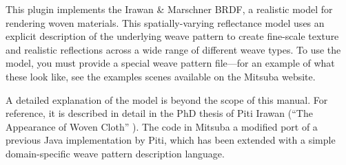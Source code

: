 This plugin implements the Irawan \& Marschner BRDF,
a realistic model for rendering woven materials.
This spatially-varying reflectance model uses an explicit description
of the underlying weave pattern to create fine-scale texture and
realistic reflections across a wide range of different weave types.
To use the model, you must provide a special weave pattern
file---for an example of what these look like, see the
examples scenes available on the Mitsuba website.

A detailed explanation of the model is beyond the scope of this manual.
For reference, it is described in detail in the PhD thesis of
Piti Irawan (``The Appearance of Woven Cloth'' \cite{IrawanThesis}).
The code in Mitsuba a modified port of a previous Java implementation
by Piti, which has been extended with a simple domain-specific weave
pattern description language. \vspace{8mm}

